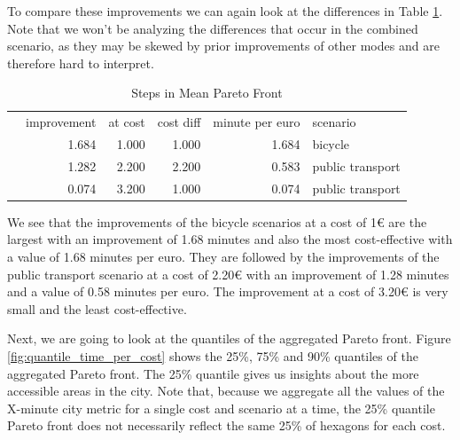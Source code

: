 To compare these improvements we can again look at the differences in Table \ref{tab:differences_in_mean_pareto_front}.
Note that we won't be analyzing the differences that occur in the combined scenario, as they may be skewed by prior improvements of other modes and are therefore hard to interpret.

\begin{table}
  \caption{Steps in Mean Pareto Front}
  \label{tab:differences_in_mean_pareto_front}
  \begin{center}
    \begin{tabular}{lrrrrl}
     & improvement & at cost & cost diff & minute per euro & scenario \\
     & 1.684 & 1.000 & 1.000 & 1.684 & bicycle \\
     & 1.282 & 2.200 & 2.200 & 0.583 & public transport \\
     & 0.074 & 3.200 & 1.000 & 0.074 & public transport \\
    \end{tabular}
  \end{center}
\end{table}

We see that the improvements of the bicycle scenarios at a cost of 1€ are the largest with an improvement of 1.68 minutes and also the most cost-effective with a value of 1.68 minutes per euro.
They are followed by the improvements of the public transport scenario at a cost of 2.20€ with an improvement of 1.28 minutes and a value of 0.58 minutes per euro.
The improvement at a cost of 3.20€ is very small and the least cost-effective.

Next, we are going to look at the quantiles of the aggregated Pareto front.
Figure \ref{fig:quantile_time_per_cost} shows the 25\%, 75\% and 90\% quantiles of the aggregated Pareto front.
The 25\% quantile gives us insights about the more accessible areas in the city.
Note that, because we aggregate all the values of the X-minute city metric for a single cost and scenario at a time, the 25\% quantile Pareto front does not necessarily reflect the same 25\% of hexagons for each cost.

